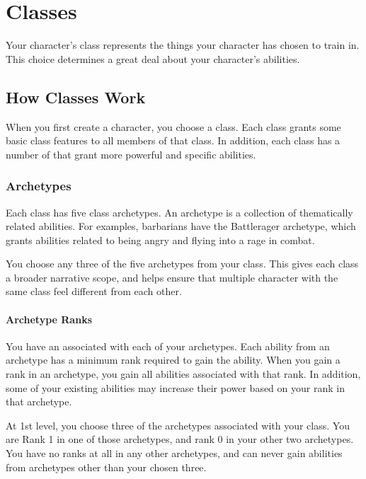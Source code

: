 \chapter{Classes}\label{Classes}

Your character's class represents the things your character has chosen to train in.
This choice determines a great deal about your character's abilities.

\section{How Classes Work}
    When you first create a character, you choose a class.
    Each class grants some basic class features to all members of that class.
    In addition, each class has a number of  that grant more powerful and specific abilities.

    \subsection{Archetypes}\label{Archetypes}
        Each class has five class archetypes.
        An archetype is a collection of thematically related abilities.
        For examples, barbarians have the Battlerager archetype, which grants abilities related to being angry and flying into a rage in combat.

        You choose any three of the five archetypes from your class.
        This gives each class a broader narrative scope, and helps ensure that multiple character with the same class feel different from each other.

        \subsubsection{Archetype Ranks}\label{Archetype Ranks}
            You have an  associated with each of your archetypes.
            Each ability from an archetype has a minimum rank required to gain the ability.
            When you gain a rank in an archetype, you gain all abilities associated with that rank.
            In addition, some of your existing abilities may increase their power based on your rank in that archetype.

            At 1st level, you choose three of the archetypes associated with your class.
            You are Rank 1 in one of those archetypes, and rank 0 in your other two archetypes.
            You have no ranks at all in any other archetypes, and can never gain abilities from archetypes other than your chosen three.

